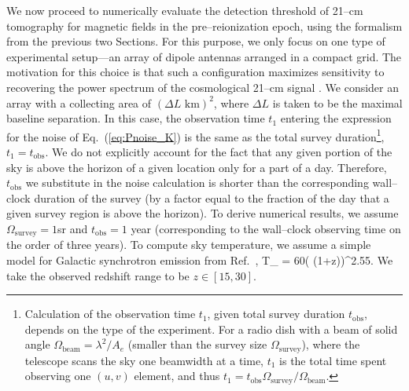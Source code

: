 We now proceed to numerically evaluate the detection threshold of 21--cm tomography for magnetic fields in the pre--reionization epoch, using the formalism from the previous two Sections. For this purpose, we only focus on one type of experimental setup---an array of dipole antennas arranged in a compact grid. The motivation for this choice is that such a configuration maximizes sensitivity to recovering the power spectrum of the cosmological 21--cm signal \cite{2009PhRvD..79h3530T,2015AAS...22532803D}. We consider an array with a collecting area of $(\Delta L\text{ km})^2$, where $\Delta L$ is taken to be the maximal baseline separation. In this case, the observation time $t_1$ entering the expression for the noise of Eq.~(\ref{eq:Pnoise_K}) is the same as the total survey duration\footnote{Calculation of the observation time $t_1$, given total survey duration $t_\text{obs}$, depends on the type of the experiment. For a radio dish with a beam of solid angle $\Omega_\text{beam}=\lambda^2/A_e$ (smaller than the survey size $\Omega_\text{survey}$), where the telescope scans the sky one beamwidth at a time, $t_1$ is the total time spent observing one $(u,v)$ element, and thus $t_1=t_\text{obs}\Omega_\text{survey}/\Omega_\text{beam}$.}, $t_1=t_\text{obs}$. We do not explicitly account for the fact that any given portion of the sky is above the horizon of a given location only for a part of a day. Therefore, $t_\text{obs}$ we substitute in the noise calculation is shorter than the corresponding wall--clock duration of the survey (by a factor equal to the fraction of the day that a given survey region is above the horizon). To derive numerical results, we assume $\Omega_\text{survey}=1$sr and $t_\text{obs}=1$ year (corresponding to the wall--clock observing time on the order of three years). To compute sky temperature, we assume a simple model for Galactic synchrotron emission from Ref.~\cite{2008PhRvD..78b3529M}, 
\beq
T_  = 60\left( (1+z)\right)^{2.55}\text{   [K]}.
\label{eq:tsys}
\eeq
We take the observed redshift range to be $z\in[15,30]$. 

